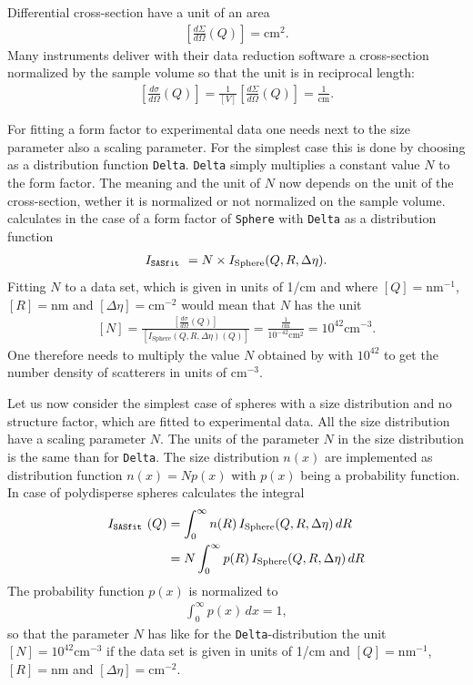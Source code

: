 Differential cross-section have a unit of an area
\begin{align}
\left[\frac{d\Sigma}{d\Omega}(Q)\right] = \textrm{cm}^2.
\end{align}
Many instruments deliver with their data reduction software a
cross-section normalized by the sample volume so that the unit is in
reciprocal length:
\begin{align}
\left[\frac{d\sigma}{d\Omega}(Q)\right]
= \frac{1}{\left[V\right]}\left[\frac{d\Sigma}{d\Omega}(Q)\right]
= \frac{1}{\textrm{cm}}
.
\end{align}

For fitting a form factor to experimental data one needs next to the size parameter also a
scaling parameter. For the simplest case this is done by choosing as a distribution function
\texttt{Delta}. \texttt{Delta} simply multiplies a constant value $N$ to the form factor.
The meaning and the unit of $N$ now depends on the unit of the cross-section, wether it is
normalized or not normalized on the sample volume. \SASfit calculates in the case of
a form factor of \texttt{Sphere} with \texttt{Delta} as a distribution function
\begin{align}
I_\text{\SASfit} = N \times I_\text{Sphere}(Q,R,\Delta\eta).
\end{align}
Fitting $N$ to a data set, which is given in units of 1/cm and where $[Q]=\textrm{nm}^{-1}$, $[R]=\textrm{nm}$
and $[\Delta\eta]=\textrm{cm}^{-2}$ would mean that $N$ has the unit
\begin{align}
\left[ N \right] = \frac{\left[\frac{d\sigma}{d\Omega}(Q)\right]}{\left[I_\text{Sphere}(Q,R,\Delta\eta)(Q)\right]}
= \frac{\frac{1}{\textrm{cm}}}{10^{-42}\textrm{cm}^2} = 10^{42} \textrm{cm}^{-3}.
\end{align}
One therefore needs to multiply the value $N$ obtained by \SASfit
with $10^{42}$ to get the number density of scatterers in units of cm$^{-3}$.

Let us now consider the simplest case of spheres with a size distribution and no structure factor,
which are fitted to experimental data. All the size distribution have a scaling parameter $N$.
The units of the parameter $N$ in the size distribution is the same than for \texttt{Delta}.
The size distribution $n(x)$ are implemented as distribution function $n(x) = N p(x)$ with $p(x)$
being a probability function. In case of polydisperse spheres \SASfit calculates the integral
\begin{align}
I_\text{\SASfit} (Q)
&= \int_0^\infty n(R) \, I_\text{Sphere}(Q,R,\Delta\eta) \, dR \\
&= N \int_0^\infty p(R) \, I_\text{Sphere}(Q,R,\Delta\eta) \, dR
\end{align}
The probability function $p(x)$ is normalized to
\begin{align}
\int_0^\infty p(x) \, dx = 1,
\end{align}
so that the parameter $N$ has like for the
\texttt{Delta}-distribution the unit $\left[ N \right]= 10^{42}
\textrm{cm}^{-3}$ if the data set is given in units of 1/cm and
$[Q]=\textrm{nm}^{-1}$, $[R]=\textrm{nm}$ and
$[\Delta\eta]=\textrm{cm}^{-2}$.

